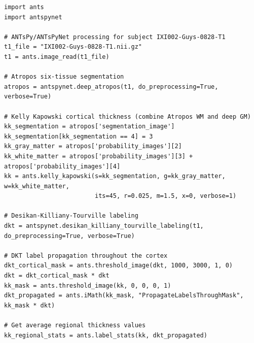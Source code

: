 \documentclass[12pt,]{article}
\begin{document}
\vspace{10mm}


\begin{lstlisting}
import ants
import antspynet

# ANTsPy/ANTsPyNet processing for subject IXI002-Guys-0828-T1
t1_file = "IXI002-Guys-0828-T1.nii.gz"
t1 = ants.image_read(t1_file)

# Atropos six-tissue segmentation
atropos = antspynet.deep_atropos(t1, do_preprocessing=True, verbose=True)

# Kelly Kapowski cortical thickness (combine Atropos WM and deep GM)
kk_segmentation = atropos['segmentation_image']
kk_segmentation[kk_segmentation == 4] = 3
kk_gray_matter = atropos['probability_images'][2]
kk_white_matter = atropos['probability_images'][3] + atropos['probability_images'][4]
kk = ants.kelly_kapowski(s=kk_segmentation, g=kk_gray_matter, w=kk_white_matter,
                         its=45, r=0.025, m=1.5, x=0, verbose=1)

# Desikan-Killiany-Tourville labeling
dkt = antspynet.desikan_killiany_tourville_labeling(t1, do_preprocessing=True, verbose=True)

# DKT label propagation throughout the cortex
dkt_cortical_mask = ants.threshold_image(dkt, 1000, 3000, 1, 0)
dkt = dkt_cortical_mask * dkt
kk_mask = ants.threshold_image(kk, 0, 0, 0, 1)
dkt_propagated = ants.iMath(kk_mask, "PropagateLabelsThroughMask", kk_mask * dkt)

# Get average regional thickness values
kk_regional_stats = ants.label_stats(kk, dkt_propagated)
\end{lstlisting}
\end{document}
